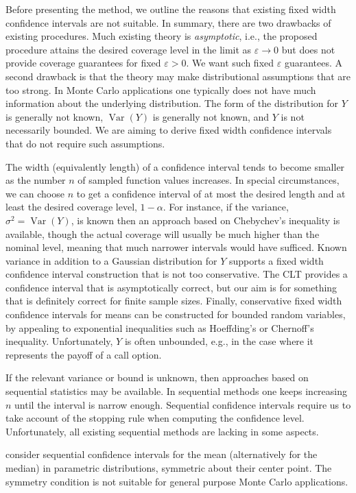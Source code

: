 \documentclass[graybox]{svmult}
\DeclareMathOperator{\var}{Var}
\begin{document}
Before presenting the method, we outline the reasons
that existing fixed width confidence intervals are not suitable.  In summary, there are two drawbacks of existing procedures.  Much existing theory is \emph{asymptotic}, i.e., the proposed procedure attains the desired coverage level in the limit as $\varepsilon\to 0$ but does not provide
coverage guarantees for fixed $\varepsilon>0$.  We want such fixed $\varepsilon$ guarantees.  A second drawback is that the theory may make distributional assumptions that are too strong.  In Monte Carlo applications one typically does not have much information about the underlying distribution.  The form of the distribution for $Y$ is generally not known, $\var(Y)$ is generally not known, and $Y$ is not necessarily bounded. We are aiming to derive fixed width confidence intervals that do not require such assumptions.  

The width (equivalently length) of a confidence interval
tends to become smaller as the number $n$ of sampled
function values increases. In special circumstances, we can choose $n$ to get
a confidence interval of at most the desired length and at
least the desired coverage level, $1-\alpha$. For instance, if the variance, $\sigma^2=\var(Y)$, is known then an approach based on Chebychev's
inequality is available, though the actual coverage
will usually be much higher than the nominal level,
meaning that much narrower intervals would have sufficed.
Known variance in addition to a Gaussian distribution for $Y$
supports a fixed width confidence interval construction that
is not too conservative. The CLT provides a confidence interval that is asymptotically correct, but our aim is for something that is definitely correct for finite sample sizes.
Finally, conservative fixed width confidence intervals
for means can be constructed for bounded random variables, by appealing
to exponential inequalities such as Hoeffding's or Chernoff's inequality.  Unfortunately, $Y$ is often unbounded, e.g., in the case where it represents the payoff of a call option.

If the relevant variance or bound is unknown, then approaches
based on sequential statistics \citep{Sie85a}
may be available.  In sequential methods one keeps increasing
$n$ until the interval is narrow enough. Sequential
confidence intervals require us to take account of the
stopping rule when computing the confidence level. Unfortunately, all existing sequential methods are lacking in some aspects. 

\cite{SerfWack1976} consider sequential confidence intervals for the mean (alternatively for the median) in parametric distributions, symmetric about their center point.  The symmetry condition is not suitable for general
purpose Monte Carlo applications.
\end{document}
